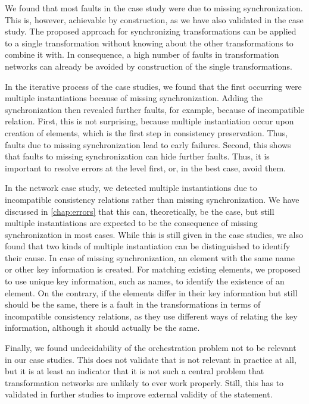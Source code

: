 We found that most faults in the case study were due to missing synchronization.
This is, however, achievable by construction, as we have also validated in the case study.
The proposed approach for synchronizing transformations can be applied to a single transformation without knowing about the other transformations to combine it with.
In consequence, a high number of faults in transformation networks can already be avoided by construction of the single transformations.

In the iterative process of the case studies, we found that the first occurring were multiple instantiations because of missing synchronization.
Adding the synchronization then revealed further faults, for example, because of incompatible relation.
First, this is not surprising, because multiple instantiation occur upon creation of elements, which is the first step in consistency preservation.
Thus, faults due to missing synchronization lead to early failures.
Second, this shows that faults to missing synchronization can hide further faults.
Thus, it is important to resolve errors at the \leveltransformation level first, or, in the best case, avoid them.

In the network case study, we detected multiple instantiations due to incompatible consistency relations rather than missing synchronization.
We have discussed in \autoref{chap:errors} that this can, theoretically, be the case, but still multiple instantiations are expected to be the consequence of missing synchronization in most cases.
While this is still given in the case studies, we also found that two kinds of multiple instantiation can be distinguished to identify their cause.
In case of missing synchronization, an element with the same name or other key information is created.
For matching existing elements, we proposed to use unique key information, such as names, to identify the existence of an element.
On the contrary, if the elements differ in their key information but still should be the same, there is a fault in the transformations in terms of incompatible consistency relations, as they use different ways of relating the key information, although it should actually be the same.

Finally, we found undecidability of the orchestration problem not to be relevant in our case studies.
This does not validate that is not relevant in practice at all, but it is at least an indicator that it is not such a central problem that transformation networks are unlikely to ever work properly.
Still, this has to validated in further studies to improve external validity of the statement.

